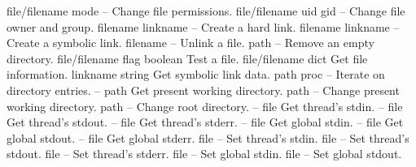 \begin{longtable}{}
	{file/filename mode}
	{{\bf {}}}
	{--}
	{Change file permissions.}
\hline
\optableent
	{file/filename uid gid}
	{{\bf {}}}
	{--}
	{Change file owner and group.}
\hline
\optableent
	{filename linkname}
	{{\bf {}}}
	{--}
	{Create a hard link.}
\hline
\optableent
	{filename linkname}
	{{\bf {}}}
	{--}
	{Create a symbolic link.}
\hline
\optableent
	{filename}
	{{\bf {}}}
	{--}
	{Unlink a file.}
\hline
\optableent
	{path}
	{{\bf {}}}
	{--}
	{Remove an empty directory.}
\hline
\optableent
	{file/filename flag}
	{{\bf {}}}
	{boolean}
	{Test a file.}
\hline
\optableent
	{file/filename}
	{{\bf {}}}
	{dict}
	{Get file information.}
\hline
\optableent
	{linkname}
	{{\bf {}}}
	{string}
	{Get symbolic link data.}
\hline
\optableent
	{path proc}
	{{\bf {}}}
	{--}
	{Iterate on directory entries.}
\hline
\optableent
	{--}
	{{\bf {}}}
	{path}
	{Get present working directory.}
\hline
\optableent
	{path}
	{{\bf {}}}
	{--}
	{Change present working directory.}
\hline
\optableent
	{path}
	{{\bf {}}}
	{--}
	{Change root directory.}
\hline
\optableent
	{--}
	{{\bf {}}}
	{file}
	{Get thread's stdin.}
\hline
\optableent
	{--}
	{{\bf {}}}
	{file}
	{Get thread's stdout.}
\hline
\optableent
	{--}
	{{\bf {}}}
	{file}
	{Get thread's stderr.}
\hline
\optableent
	{--}
	{{\bf {}}}
	{file}
	{Get global stdin.}
\hline
\optableent
	{--}
	{{\bf {}}}
	{file}
	{Get global stdout.}
\hline
\optableent
	{--}
	{{\bf {}}}
	{file}
	{Get global stderr.}
\hline
\optableent
	{file}
	{{\bf {}}}
	{--}
	{Set thread's stdin.}
\hline
\optableent
	{file}
	{{\bf {}}}
	{--}
	{Set thread's stdout.}
\hline
\optableent
	{file}
	{{\bf {}}}
	{--}
	{Set thread's stderr.}
\hline
\optableent
	{file}
	{{\bf {}}}
	{--}
	{Set global stdin.}
\hline
\optableent
	{file}
	{{\bf {}}}
	{--}
	{Set global stdout.}
\hline
\optableent

\end{longtable}
